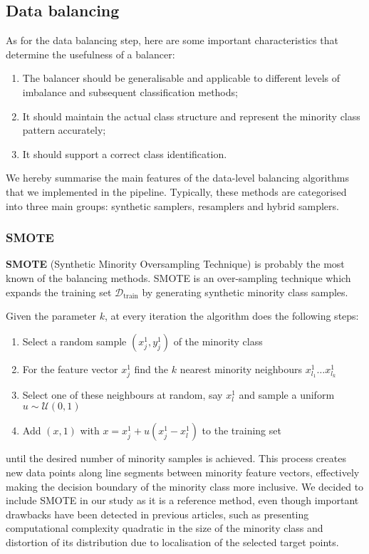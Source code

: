 \subsection{Data balancing}
As for the data balancing step, here are some important characteristics that determine the usefulness of a balancer:
\begin{enumerate}[label=$\bullet$]
\item The balancer should be generalisable and applicable to different levels of imbalance and subsequent classification methods;
\item It should maintain the actual class structure and represent the minority class pattern accurately;
\item It should support a correct class identification.
\end{enumerate}
   
We hereby summarise the main features of the data-level balancing algorithms that we implemented in the pipeline. Typically, these methods are categorised into three main groups: synthetic samplers, resamplers and hybrid samplers.

\subsubsection{SMOTE}
\textbf{SMOTE} (Synthetic Minority Oversampling Technique) is probably the most known of the balancing methods. 
SMOTE is an over-sampling technique which expands the training set $\mathcal{D}_\text{train}$ by generating synthetic minority class samples.

Given the parameter $k$, at every iteration the algorithm does the following steps:

\begin{enumerate}[label=(\roman*)]
\item Select a random sample $(x_j^1, y_j^1)$ of the minority class
\item For the feature vector $x_j^1$ find the $k$ nearest minority neighbours $x_{l_1}^1 \dots x_{l_k}^1$
\item Select one of these neighbours at random, say $x_{l}^1$ and sample a uniform $u \sim \mathcal{U}(0,1)$
\item Add $(x, 1)$ with $x = x_j^1 + u (x_j^1 - x_l^1)$ to the training set
\end{enumerate}

until the desired number of minority samples is achieved.
This process creates new data points along line segments between minority feature vectors, effectively making the decision boundary of the minority class more inclusive. 
We decided to include SMOTE in our study as it is a reference method, even though important drawbacks have been detected in previous articles, 
such as presenting computational complexity quadratic in the size of the minority class and distortion of its distribution due to localisation of the selected target points.



